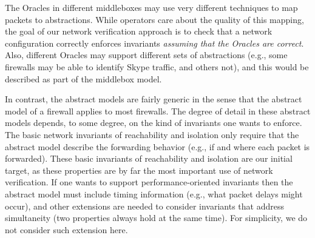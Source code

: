 The Oracles in different middleboxes may use very different techniques to map packets to abstractions. While operators care about the quality of this mapping, the goal of our network verification approach is to check that a network configuration correctly enforces invariants {\em assuming that the Oracles are correct}. Also, different Oracles may  support different sets of abstractions (e.g., some firewalls may be able to identify Skype traffic, and others not), and this would be described as part of the middlebox model.

In contrast, the abstract models are fairly generic in the sense that the abstract model of a firewall applies to most firewalls. The degree of detail in these abstract models depends, to some degree, on the kind of invariants one wants to enforce.  The basic network invariants of reachability and isolation only require that the abstract model describe the forwarding behavior (e.g., if and where each packet is forwarded). These basic invariants of reachability and isolation are our initial target, as these properties are by far the most important use of network verification. If one wants to support performance-oriented invariants then the abstract model must include timing information (e.g., what packet delays might occur), and other extensions are needed to consider invariants that address simultaneity (two properties always hold at the same time). For simplicity, we do not consider such extension here.

